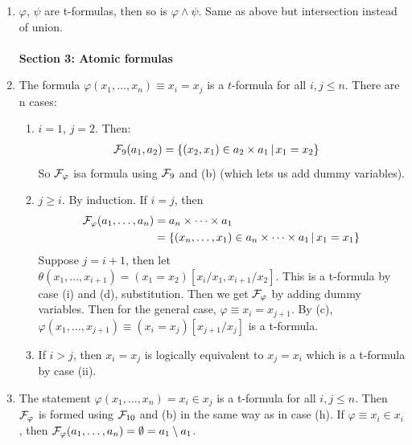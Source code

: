 \documentclass{article}
\begin{document}
\begin{enumerate}
    \item[(g)] $\varphi$, $\psi$ are t-formulas, then so is $\varphi \wedge \psi$. Same as above but intersection instead of union.\\\hspace{0.1cm}\\
          \textbf{Section 3: Atomic formulas}
    \item[(h)] \newlec The formula $\varphi(x_{1},\dots,x_{n}) \equiv x_{i}=x_{j}$ is a $t$-formula for all $i,j\leq n$. There are n cases:
          \begin{enumerate}
              \item[(i)] $i=1$, $j=2$. Then: \begin{align*}
                        \mathcal{F}_{9}(a_{1},a_{2}) & = \{(x_{2},x_{1}) \in a_{2} \times a_{1} \, | \, x_{1}=x_{2}\}
                    \end{align*}
                    So $\mathcal{F}_{\varphi}$ isa formula using $\mathcal{F}_{9}$ and (b) (which lets us add dummy variables).
              \item[(ii)] $j \geq i$. By induction. If $i=j$, then \begin{align*}
                        \mathcal{F}_{\varphi}(a_{1},\dots,a_{n}) & = a_{n} \times \dots \times a_{1}                                                  \\
                                                           & = \{ (x_{n},\dots,x_{1}) \in a_{n} \times \dots \times a_{1} \, | \, x_{1}=x_{1}\}
                    \end{align*}
                    Suppose $j=i+1$, then let $\theta(x_{1}, \dots, x_{i+1}) = (x_{1}=x_{2})[x_{i}/x_{1}, x_{i+1}/x_{2}]$. This is a t-formula by case (i) and (d), substitution. Then we get $\mathcal{F}_{\varphi}$ by adding dummy variables.\gap
                    Then for the general case, $\varphi \equiv x_{i} = x_{j+1}$. By (c), $\varphi(x_{1},\dots,x_{j+1}) \equiv (x_{i}=x_{j})[x_{j+1}/x_{j}]$ is a t-formula.\gap
              \item[(iii)] If $i > j$, then $x_{i}=x_{j}$ is logically equivalent to $x_{j}=x_{i}$ which is a t-formula by case (ii).
          \end{enumerate}
    \item[(i)] The statement $\varphi(x_{1},\dots,x_{n}) = x_{i} \in x_{j}$ is a t-formula for all $i,j\leq n$. Then $\mathcal{F}_{\varphi}$ is formed using $\mathcal{F}_{10}$ and (b) in the same way as in case (h).\gap
          If $\varphi \equiv x_{i} \in x_{i}$, then $\mathcal{F}_{\varphi}(a_{1},\dots, a_{n}) = \emptyset = a_{1} \setminus a_{1}$. \gap

\end{enumerate}
\end{document}
